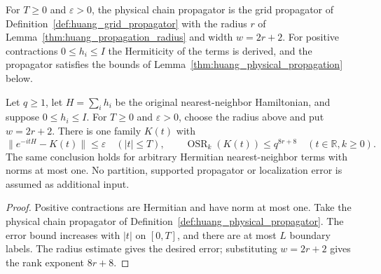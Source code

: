 \begin{definition}
    \label{def:huang_physical_propagator}
    \leanok
    For $T\ge0$ and $\varepsilon>0$, the physical chain propagator is the grid
    propagator of Definition~\ref{def:huang_grid_propagator} with the radius
    $r$ of Lemma~\ref{thm:huang_propagation_radius} and width $w=2r+2$. For
    positive contractions $0\le h_i\le I$ the Hermiticity of the terms is
    derived, and the propagator satisfies the bounds of
    Lemma~\ref{thm:huang_physical_propagation} below.
\end{definition}

\begin{lemma}
    \label{thm:huang_physical_propagation}
    \leanok
    Let $q\ge1$, let $H=\sum_ih_i$ be the original nearest-neighbor Hamiltonian,
    and suppose $0\le h_i\le I$. For $T\ge0$ and $\varepsilon>0$, choose the radius
    above and put $w=2r+2$. There is one family $K(t)$ with
    \[
        \|e^{-itH}-K(t)\|\le\varepsilon\quad (|t|\le T),\qquad
        \operatorname{OSR}_k(K(t))\le q^{8r+8}\quad(t\in\mathbb R, k\ge0).
    \]
    The same conclusion holds for arbitrary Hermitian nearest-neighbor terms
    with norms at most one. No partition, supported propagator or localization
    error is assumed as additional input.
\end{lemma}
\begin{proof}
    \leanok
    Positive contractions are Hermitian and have norm at most one. Take the
    physical chain propagator of Definition~\ref{def:huang_physical_propagator}. The error bound increases with $|t|$ on
    $[0,T]$, and there are at most $L$ boundary labels. The radius estimate gives
    the desired error; substituting $w=2r+2$ gives the rank exponent $8r+8$.
\end{proof}
